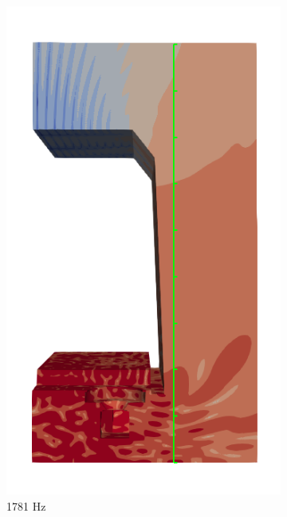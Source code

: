\begin{figure}[H]
	\centering
	\begin{subfigure}[b]{0.3\textwidth}
		\centering
		\includegraphics[width=\linewidth]{fig/chap5/freq_steps/field_result_1781Hz.png}
		\caption{1781 Hz}
	\end{subfigure}
	\hfill
	\begin{subfigure}[b]{0.3\textwidth}
		\centering

\end{subfigure}
\end{figure}
